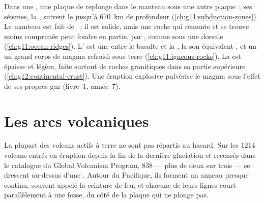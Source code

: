 \begin{recall}
Dans une , une plaque de  replonge
dans le manteau sous une autre plaque~; ses séismes, la , suivent le  jusqu'à \qty{670}{km} de
profondeur (\cref{ch:g11:subduction-zones}). Le manteau est fait de
~; il est solide, mais une roche qui remonte et se trouve moins
comprimée peut fondre en partie, par , comme sous
une dorsale (\cref{ch:g11:ocean-ridges}). L' est une   entre le basalte et la , la  son
équivalent , et un  un grand corps de magma refroidi sous
terre (\cref{ch:g11:igneous-rocks}). La  est épaisse et
légère, faite surtout de roches granitiques dans sa partie supérieure
(\cref{ch:g12:continental-crust}). Une éruption explosive pulvérise le magma
sous l'effet de ses propres gaz (livre~1, année~7).
\end{recall}

\section{Les arcs volcaniques}

La plupart des volcans actifs à terre ne sont pas répartis au hasard. Sur
les 1214 volcans entrés en éruption depuis la fin de la dernière glaciation
et recensés dans le catalogue du Global Volcanism Program, 838 --- plus de
deux sur trois --- se dressent au-dessus d'une . Autour du
Pacifique, ils forment un anneau presque continu, souvent appelé la ceinture
de feu, et chacune de leurs lignes court parallèlement à une fosse, du côté
de la plaque qui ne plonge pas.

